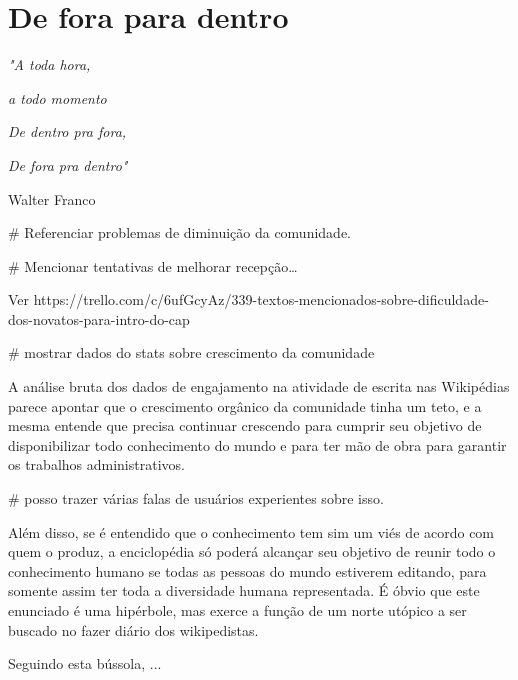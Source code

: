 \chapter{De fora para dentro}

\singlespacing
\begin{flushright}
\textit{"A toda hora,}

\textit{a todo momento}

\textit{De dentro pra fora,}

\textit{De fora pra dentro"}

Walter Franco
\end{flushright}
\doublespacing


# Referenciar problemas de diminuição da comunidade.


# Mencionar tentativas de melhorar recepção…

Ver https://trello.com/c/6ufGcyAz/339-textos-mencionados-sobre-dificuldade-dos-novatos-para-intro-do-cap%

# mostrar dados do stats sobre crescimento da comunidade

A análise bruta dos dados de engajamento na atividade de escrita nas Wikipédias parece apontar que o crescimento orgânico da comunidade tinha um teto, e a mesma entende que precisa continuar crescendo para cumprir seu objetivo de disponibilizar todo conhecimento do mundo e para ter mão de obra para garantir os trabalhos administrativos.

# posso trazer várias falas de usuários experientes sobre isso.

Além disso, se é entendido que o conhecimento tem sim um viés de acordo com quem o produz, a enciclopédia só poderá alcançar seu objetivo de reunir todo o conhecimento humano se todas as pessoas do mundo estiverem editando, para somente assim ter toda a diversidade humana representada. É óbvio que este enunciado é uma hipérbole, mas exerce a função de um norte utópico a ser buscado no fazer diário dos wikipedistas.

Seguindo esta bússola, ...







